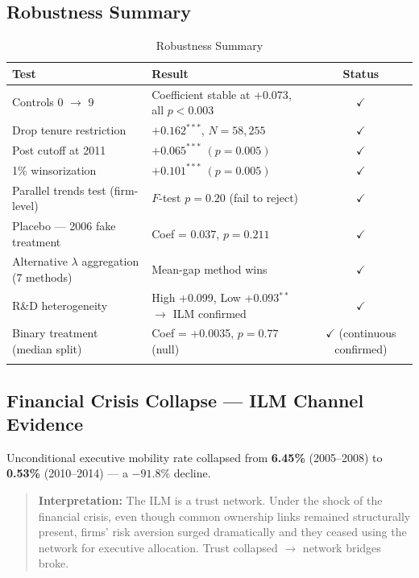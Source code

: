 \documentclass[11pt,a4paper]{article}
\begin{document}
\newpage

\subsection{Robustness Summary}

\begin{longtable}{p{5cm}lc}
\toprule
\textbf{Test} & \textbf{Result} & \textbf{Status} \\
\midrule
Controls 0 \(\rightarrow\) 9 & Coefficient stable at \(+0.073\), all \(p < 0.003\) & \(\checkmark\) \\
Drop tenure restriction & \(+0.162^{***}\), \(N = 58,255\) & \(\checkmark\) \\
Post cutoff at 2011 & \(+0.065^{***}\) \((p = 0.005)\) & \(\checkmark\) \\
1\% winsorization & \(+0.101^{***}\) \((p = 0.005)\) & \(\checkmark\) \\
Parallel trends test (firm-level) & \(F\)-test \(p = 0.20\) (fail to reject) & \(\checkmark\) \\
Placebo — 2006 fake treatment & Coef = 0.037, \(p = 0.211\) & \(\checkmark\) \\
Alternative \(\lambda\) aggregation (7 methods) & Mean-gap method wins & \(\checkmark\) \\
R\&D heterogeneity & High +0.099, Low +0.093\(^{**}\) \(\rightarrow\) ILM confirmed & \(\checkmark\) \\
Binary treatment (median split) & Coef = +0.0035, \(p = 0.77\) (null) & \(\checkmark\) (continuous confirmed) \\
\bottomrule
\caption{Robustness Summary}
\end{longtable}

\subsection{Financial Crisis Collapse — ILM Channel Evidence}

Unconditional executive mobility rate collapsed from {\bf 6.45\%} (2005--2008) to {\bf 0.53\%} (2010--2014) — a \(-91.8\%\) decline.

\begin{quote}
{\bf Interpretation:} The ILM is a trust network. Under the shock of the financial crisis, even though common ownership links remained structurally present, firms' risk aversion surged dramatically and they ceased using the network for executive allocation. Trust collapsed \(\rightarrow\) network bridges broke.
\end{quote}
\end{document}
